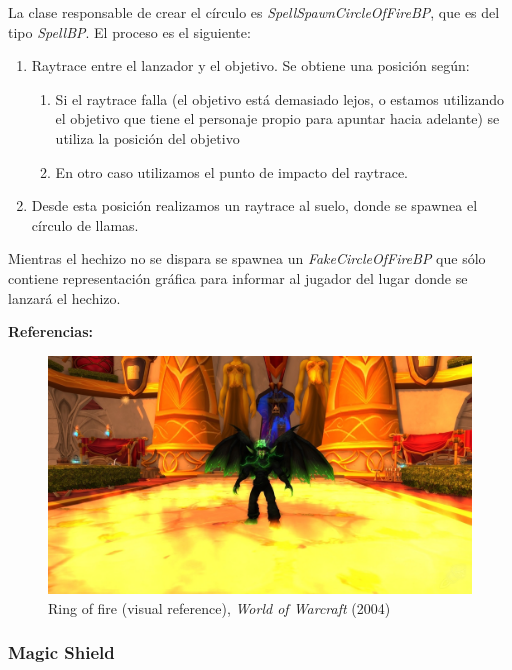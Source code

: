 \documentclass[12pt]{report}
\begin{document}
La clase responsable de crear el círculo es \textit{SpellSpawnCircleOfFireBP}, que es del tipo \textit{SpellBP}. El proceso es el siguiente:

\begin{enumerate}
	\item Raytrace entre el lanzador y el objetivo. Se obtiene una posición según:
	\begin{enumerate}
		\item Si el raytrace falla (el objetivo está demasiado lejos, o estamos utilizando el objetivo que tiene el personaje propio para apuntar hacia adelante) se utiliza la posición del objetivo
		\item En otro caso utilizamos el punto de impacto del raytrace.
	\end{enumerate}
	\item Desde esta posición realizamos un raytrace al suelo, donde se spawnea el círculo de llamas.
\end{enumerate}

Mientras el hechizo no se dispara se spawnea un \textit{FakeCircleOfFireBP} que sólo contiene representación gráfica para informar al jugador del lugar donde se lanzará el hechizo.

\textbf{Referencias:}

\begin{figure}[H]
    \centering
    \includegraphics[width=1\textwidth]{ring_of_fire_wow_reference}
	\captionsetup{labelformat=empty}
    \caption{Ring of fire (visual reference), \textit{World of Warcraft} (2004)}
\end{figure}

\newpage
\subsubsection{Magic Shield}
\end{document}
